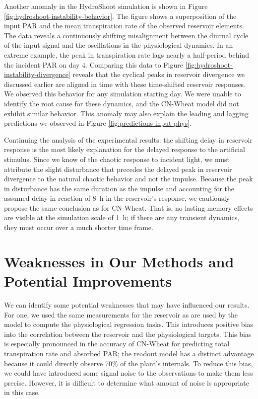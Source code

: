 Another anomaly in the HydroShoot simulation is shown in Figure \ref{fig:hydroshoot-instability-behavior}.
The figure shows a superposition of the input PAR and the mean transpiration rate of the observed reservoir elements.
The data reveals a continuously shifting misalignment between the diurnal cycle of the input signal and the oscillations in the physiological dynamics.
In an extreme example, the peak in transpiration rate lags nearly a half-period behind the incident PAR on day 4.
Comparing this data to Figure \ref{fig:hydroshoot-instability-divergence} reveals that the cyclical peaks in reservoir divergence we discussed earlier are aligned in time with these time-shifted reservoir responses.
We observed this behavior for any simulation starting day.
We were unable to identify the root cause for these dynamics, and the CN-Wheat model did not exhibit similar behavior.
This anomaly may also explain the leading and lagging predictions we observed in Figure \ref{fig:predictions-input-phys}.


Continuing the analysis of the experimental results: the shifting delay in reservoir response is the most likely explanation for the delayed response to the artificial stimulus.
Since we know of the chaotic response to incident light, we must attribute the slight disturbance that precedes the delayed peak in reservoir divergence to the natural chaotic behavior and not the impulse.
Because the peak in disturbance has the same duration as the impulse and accounting for the assumed delay in reaction of \SI{8}{\hour} in the reservoir's response, we cautiously propose the same conclusion as for CN-Wheat.
That is, no lasting memory effects are visible at the simulation scale of \SI{1}{\hour}; if there are any transient dynamics, they must occur over a much shorter time frame.




\section{Weaknesses in Our Methods and Potential Improvements}

We can identify some potential weaknesses that may have influenced our results.
For one, we used the same measurements for the reservoir as are used by the model to compute the physiological regression tasks.
This introduces positive bias into the correlation between the reservoir and the physiological targets.
This bias is especially pronounced in the accuracy of CN-Wheat for predicting total transpiration rate and absorbed PAR; 
the readout model has a distinct advantage because it could directly observe 70\% of the plant's internals.
To reduce this bias, we could have introduced some signal noise to the observations to make them less precise.
However, it is difficult to determine what amount of noise is appropriate in this case.

